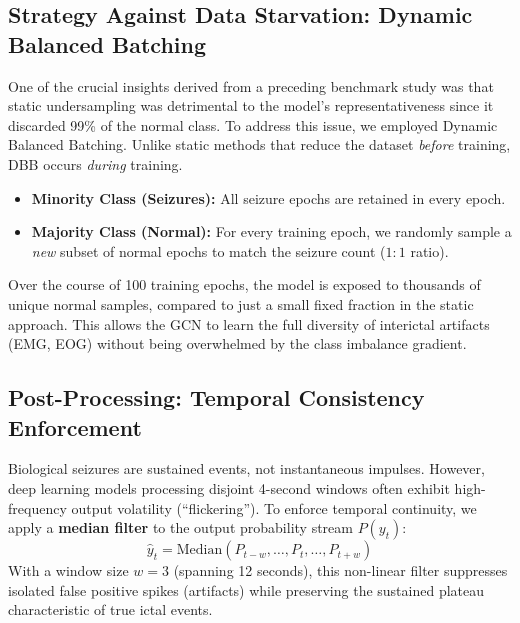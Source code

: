 \documentclass[journal]{IEEEtran}
\begin{document}
\subsection{Strategy Against Data Starvation: Dynamic Balanced Batching}
One of the crucial insights derived from a preceding benchmark study was that static undersampling was detrimental to the model's representativeness since it discarded 99\% of the normal class. To address this issue, we employed Dynamic Balanced Batching.
Unlike static methods that reduce the dataset \textit{before} training, DBB occurs \textit{during} training.
\begin{itemize}
    \item \textbf{Minority Class (Seizures):} All seizure epochs are retained in every epoch.
    \item \textbf{Majority Class (Normal):} For every training epoch, we randomly sample a \textit{new} subset of normal epochs to match the seizure count ($1:1$ ratio).
\end{itemize}
Over the course of 100 training epochs, the model is exposed to thousands of unique normal samples, compared to just a small fixed fraction in the static approach. This allows the GCN to learn the full diversity of interictal artifacts (EMG, EOG) without being overwhelmed by the class imbalance gradient.

\subsection{Post-Processing: Temporal Consistency Enforcement}
Biological seizures are sustained events, not instantaneous impulses. However, deep learning models processing disjoint 4-second windows often exhibit high-frequency output volatility (``flickering''). To enforce temporal continuity, we apply a \textbf{median filter} to the output probability stream $P(y_t)$:
\begin{equation}
\hat{y}_t = \text{Median}(P_{t-w}, \dots, P_t, \dots, P_{t+w})
\end{equation}
With a window size $w=3$ (spanning 12 seconds), this non-linear filter suppresses isolated false positive spikes (artifacts) while preserving the sustained plateau characteristic of true ictal events.
\end{document}
